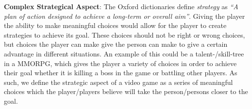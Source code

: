 \textbf{Complex Strategical Aspect}: The Oxford dictionaries define \textit{strategy} as \textit{``A plan of action designed to achieve a long-term or overall aim''}.\cite{strategyOx}
Giving the player the ability to make meaningful choices would allow for the player to create strategies to achieve its goal.
These choices should not be right or wrong choices, but choices the player can make give the person can make to give a certain advantage in different situations.
An example of this could be a talent-/skill-tree in a MMORPG, which gives the player a variety of choices in order to achieve their goal whether it is killing a boss in the game or battling other players.
As such, we define the strategic aspect of a video game as a series of meaningful choices which the player/players believe will take the person/persons closer to the goal.
